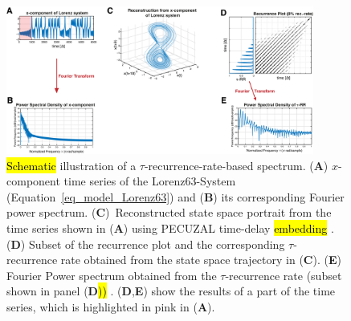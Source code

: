 \documentclass[entropy,article,accept,pdftex,moreauthors]{Definitions/mdpi}
\begin{document}
\begin{figure}[H]
 \includegraphics[width=0.9\textwidth]{./figures/fig_tau_rr_spectrum_example}
 \caption{\hl{Schematic} %
 illustration of a $\tau$-recurrence-rate-based spectrum. (\textbf{A}) $x$-component time series of the Lorenz63-System (Equation~\eqref{eq_model_Lorenz63}) and 
 (\textbf{B}) its corresponding Fourier power spectrum. 
 (\textbf{C})~Reconstructed state space portrait from the time series shown in (\textbf{A}) using PECUZAL time-delay \hl{embedding} %
 \cite{Kraemer2021}. 
 (\textbf{D}) Subset of the recurrence plot and the corresponding $\tau$-recurrence rate obtained from the state space trajectory in (\textbf{C}). 
(\textbf{E}) Fourier Power spectrum obtained from the $\tau$-recurrence rate (subset shown in panel (\textbf{D}\hl{))} %
 \cite{Zbilut2008}. (\textbf{D},\textbf{E}) show the results of a part of the time series, 
 which is highlighted in pink in (\textbf{A}).
 }\label{fig_tau_rr_spectrum_example}
\end{figure}
\end{document}
